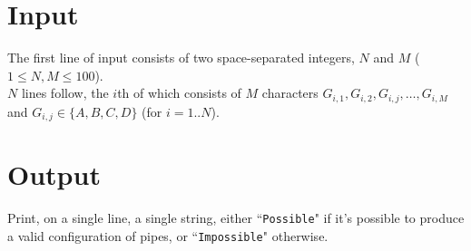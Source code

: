 \section*{Input}
The first line of input consists of two space-separated integers, $N$ and $M$ ($1 \leq N, M \leq 100$).\\
$N$ lines follow, the $i$th of which consists of $M$ characters $G_{i,1}, G_{i,2}, G_{i,j}, \dots, G_{i,M}$ and $G_{i,j} \in \{A,B,C,D\}$ (for $i = 1..N$).

\section*{Output}
Print, on a single line, a single string, either ``\texttt{Possible}" if it's possible to produce a valid configuration of pipes, or ``\texttt{Impossible}" otherwise.\\
